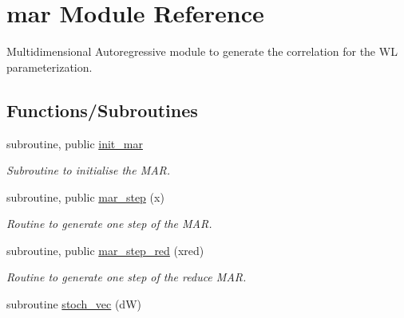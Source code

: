 \hypertarget{namespacemar}{}\section{mar Module Reference}
\label{namespacemar}


Multidimensional Autoregressive module to generate the correlation for the WL parameterization.  


\subsection*{Functions/\+Subroutines}
\begin{DoxyCompactItemize}
\item 
subroutine, public \hyperlink{namespacemar_a1cf5740699e284f3284e25421a56fe71}{init\+\_\+mar}
\begin{DoxyCompactList}\small\item\em Subroutine to initialise the M\+AR. \end{DoxyCompactList}\item 
subroutine, public \hyperlink{namespacemar_a1b839ac2dc12dde9fb271ec07c946cec}{mar\+\_\+step} (x)
\begin{DoxyCompactList}\small\item\em Routine to generate one step of the M\+AR. \end{DoxyCompactList}\item 
subroutine, public \hyperlink{namespacemar_a8b8f9249138336ac43c7b72c32f4933b}{mar\+\_\+step\+\_\+red} (xred)
\begin{DoxyCompactList}\small\item\em Routine to generate one step of the reduce M\+AR. \end{DoxyCompactList}\item 
subroutine \hyperlink{namespacemar_a3697eade9c0f250fbea1375687644267}{stoch\+\_\+vec} (dW)
\end{DoxyCompactItemize}
